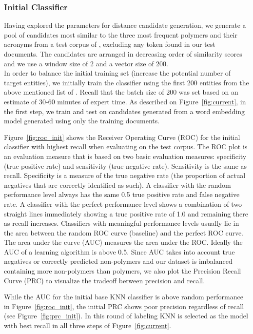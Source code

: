 \subsubsection{Initial Classifier}
Having explored the parameters for distance candidate generation, we generate a pool of  candidates most similar to the three most frequent polymers and their acronyms from a test corpus of , excluding any token found in our test documents. 
The candidates are arranged in decreasing order of similarity scores and we use a window size of 2 and a vector size of 200.  \\
In order to balance the initial training set (increase the potential number of target entities),
we initially train the classifier using the first
200 entities from the above mentioned list of .
Recall that the batch size of 200 was set based on an estimate of 30-60 minutes of expert time.
As described on Figure~\ref{fig:current}, in the first step, we train and test on candidates generated from a word embedding model generated using only the training documents. 


Figure~\ref{fig:roc_init} shows the Receiver Operating Curve (ROC) for the initial classifier with highest recall when evaluating on the test corpus. 
The ROC plot is an evaluation measure that is based on two basic evaluation measures: specificity (true positive rate) and sensitivity (true negative rate).
Sensitivity is the same as recall. Specificity is a measure of the true negative rate (the proportion of actual negatives that are correctly identified as such).
A classifier with the random performance level always has the same 0.5 true positive rate and false negative rate.
A classifier with the perfect performance level shows a combination of two straight lines immediately showing a true positive rate of 1.0 and remaining there as recall increases.
Classifiers with meaningful performance levels usually lie in the area between the random ROC curve (baseline) and the perfect ROC curve. 
The area under the curve (AUC) measures the area under the ROC.
Ideally the AUC of a learning algorithm is above 0.5. 
Since AUC takes into account true negatives or correctly predicted non-polymers and our dataset is imbalanced containing more non-polymers than polymers, we also plot the Precision Recall Curve (PRC) to visualize the tradeoff between precision and recall.

While the AUC for the initial base KNN classifier is above random performance in Figure~\ref{fig:roc_init}, the initial PRC shows poor precision regardless of recall (see Figure~\ref{fig:prc_init}).
In this round of labeling KNN is selected as the model with best recall in all three steps of Figure~\ref{fig:current}.\\


